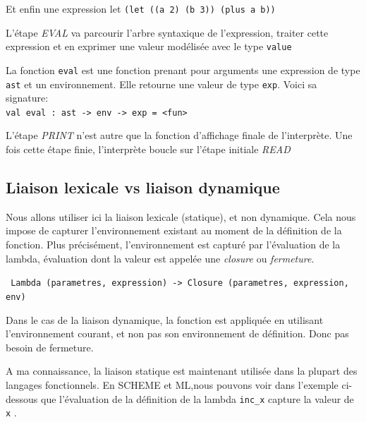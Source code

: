 \documentclass[11pt]{book}
\begin{document}
Et enfin une expression let \verb+(let ((a 2) (b 3)) (plus a b))+
\begin{center}
\end{center}

L'étape \textit{EVAL} va parcourir l'arbre syntaxique de l'expression, traiter cette expression et
en exprimer une valeur mod\'{e}lis\'{e}e avec le type \verb+value+

La fonction \verb+eval+ est une fonction prenant pour  arguments une expression de type \verb+ast+ et un environnement.
Elle retourne une valeur de type \verb+exp+. Voici sa signature: \\
\verb+val eval : ast -> env -> exp = <fun>+

L'étape \textit{PRINT} n'est autre que la fonction d'affichage finale de l'interpr\`{e}te.
Une fois cette étape finie, l'interprète boucle sur l'étape initiale \textit{READ}

\subsection{Liaison lexicale vs liaison dynamique}
Nous allons utiliser ici  la liaison lexicale (statique), et non dynamique.
 Cela nous impose de capturer l'environnement existant au moment de la d\'{e}finition de la fonction. 
Plus précisément, l'environnement est captur\'{e} par l'\'{e}valuation de la lambda, \'{e}valuation dont la valeur est appelée une \textit{closure}
ou \textit{fermeture}. 


\verb+ Lambda (parametres, expression) -> Closure (parametres, expression, env) +    


Dans le cas de la liaison dynamique, la fonction est appliqu\'{e}e en utilisant l'environnement courant, 
et non pas son environnement de définition. Donc pas besoin de fermeture.

A ma connaissance, la liaison statique est maintenant utilisée dans la plupart des langages fonctionnels.
En SCHEME et ML,nous pouvons voir dans l'exemple ci-dessous que l'\'{e}valuation de la d\'{e}finition de la
 lambda \verb+inc_x+ capture la valeur de \verb+x+ .
\end{document}
